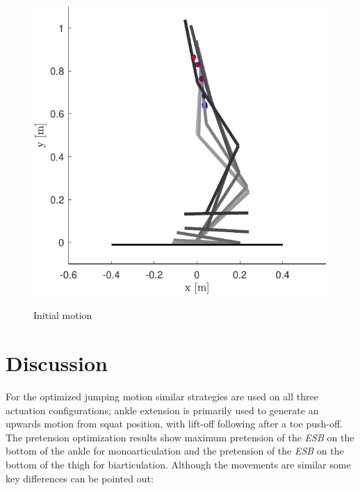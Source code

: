 \documentclass[letterpaper, 10 pt, conference]{ieeeconf}  %
\begin{document}
\begin{figure}[b]
	\centering
	{\includegraphics[scale=0.5]{initialguess}
	}%
	\caption{Initial motion} \label{fig:seq}	
\end{figure}




\section{Discussion} \label{sec:discussion}

For the optimized jumping motion similar strategies are used on all three actuation configurations; ankle extension is primarily used to generate an upwards motion from squat position, with lift-off following after a toe push-off. The pretension optimization results show maximum pretension of the \textit{ESB} on the bottom of the ankle for monoarticulation and the pretension of the \textit{ESB} on the bottom of the thigh for biarticulation. Although the movements are similar some key differences can be pointed out:
\end{document}
